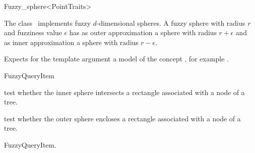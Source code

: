 

\begin{ccRefClass}{Fuzzy_sphere<PointTraits>}  %


\ccDefinition
  
The class \ccRefName\ implements fuzzy $d$-dimensional spheres.
A fuzzy sphere with radius $r$ and fuzziness value $\epsilon$ has
as outer approximation a sphere with radius $r+\epsilon$ and
as inner approximation a sphere with radius $r-\epsilon$. 


\ccParameters


Expects for the template argument a model of the concept
, for example .

\ccIsModel

FuzzyQueryItem

\ccTypes
{}

\ccCreation
{}  %




\ccOperations


{test whether the inner sphere intersects a rectangle
associated with a node of a tree.}

{test whether the outer sphere encloses a rectangle
associated with a node of a tree.}

\ccSeeAlso

FuzzyQueryItem.

\end{ccRefClass}


